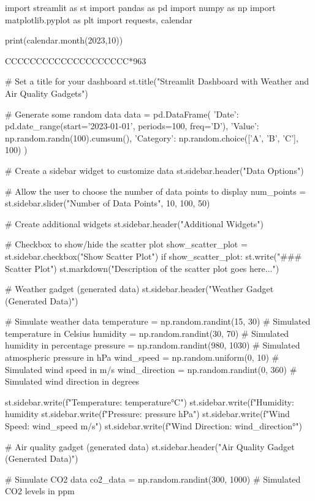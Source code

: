 import streamlit as st
import pandas as pd
import numpy as np
import matplotlib.pyplot as plt
import requests, calendar

print(calendar.month(2023,10))



CCCCCCCCCCCCCCCCCCCC*963



# Set a title for your dashboard
st.title("Streamlit Dashboard with Weather and Air Quality Gadgets")

# Generate some random data
data = pd.DataFrame({
    'Date': pd.date_range(start='2023-01-01', periods=100, freq='D'),
    'Value': np.random.randn(100).cumsum(),
    'Category': np.random.choice(['A', 'B', 'C'], 100)
})

# Create a sidebar widget to customize data
st.sidebar.header("Data Options")

# Allow the user to choose the number of data points to display
num_points = st.sidebar.slider("Number of Data Points", 10, 100, 50)

 




# Create additional widgets
st.sidebar.header("Additional Widgets")

# Checkbox to show/hide the scatter plot
show_scatter_plot = st.sidebar.checkbox("Show Scatter Plot")
if show_scatter_plot:
    st.write("### Scatter Plot")
    st.markdown("Description of the scatter plot goes here...")

# Weather gadget (generated data)
st.sidebar.header("Weather Gadget (Generated Data)")

# Simulate weather data
temperature = np.random.randint(15, 30)  # Simulated temperature in Celsius
humidity = np.random.randint(30, 70)  # Simulated humidity in percentage
pressure = np.random.randint(980, 1030)  # Simulated atmospheric pressure in hPa
wind_speed = np.random.uniform(0, 10)  # Simulated wind speed in m/s
wind_direction = np.random.randint(0, 360)  # Simulated wind direction in degrees

st.sidebar.write(f"Temperature: {temperature}°C")
st.sidebar.write(f"Humidity: {humidity}%
st.sidebar.write(f"Pressure: {pressure} hPa")
st.sidebar.write(f"Wind Speed: {wind_speed} m/s")
st.sidebar.write(f"Wind Direction: {wind_direction}°")

# Air quality gadget (generated data)
st.sidebar.header("Air Quality Gadget (Generated Data)")

# Simulate CO2 data
co2_data = np.random.randint(300, 1000)  # Simulated CO2 levels in ppm

